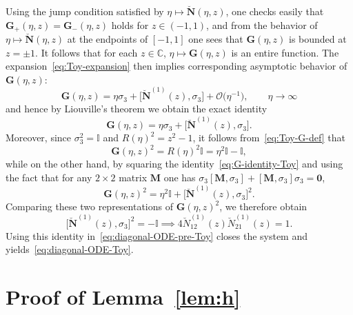 \documentclass[pdftex]{sigma}
\numberwithin{equation}{section}
\begin{document}
Using the jump condition satisfied by $\eta\mapsto\breve{\mathbf{N}}(\eta,z)$, one checks easily that $\mathbf{G}_+(\eta,z)=\mathbf{G}_-(\eta,z)$ holds for $z\in (-1,1)$, and from the behavior of $\eta\mapsto\breve{\mathbf{N}}(\eta,z)$ at the endpoints of $[-1,1]$ one sees that $\mathbf{G}(\eta,z)$ is bounded at $z=\pm 1$. It follows that for each $z\in\mathbb{C}$, $\eta\mapsto \mathbf{G}(\eta,z)$ is an entire function. The expansion~\eqref{eq:Toy-expansion} then implies corresponding asymptotic behavior of $\mathbf{G}(\eta,z)$:
\[
\mathbf{G}(\eta,z)=\eta\sigma_3 + \big[\breve{\mathbf{N}}^{(1)}(z),\sigma_3\big] + \mathcal{O}\bigl(\eta^{-1}\bigr),\qquad\eta\to\infty
\]
and hence by Liouville's theorem we obtain the exact identity
\begin{equation}
\mathbf{G}(\eta,z)=\eta\sigma_3 + \big[\breve{\mathbf{N}}^{(1)}(z),\sigma_3\big].
\label{eq:G-identity-Toy}
\end{equation}
Moreover, since $\sigma_3^2=\mathbb{I}$ and $R(\eta)^2=z^2-1$, it follows from~\eqref{eq:Toy-G-def} that
\[
\mathbf{G}(\eta,z)^2=R(\eta)^2\mathbb{I} = \eta^2\mathbb{I}-\mathbb{I},
\]
while on the other hand, by squaring the identity~\eqref{eq:G-identity-Toy} and using the fact that for any $2\times 2$ matrix $\mathbf{M}$ one has $\sigma_3[\mathbf{M},\sigma_3]+[\mathbf{M},\sigma_3]\sigma_3=\mathbf{0}$,
\[
\mathbf{G}(\eta,z)^2 = \eta^2\mathbb{I} + \big[\breve{\mathbf{N}}^{(1)}(z),\sigma_3\big]^2.
\]
Comparing these two representations of $\mathbf{G}(\eta,z)^2$, we therefore obtain
\[
\big[\breve{\mathbf{N}}^{(1)}(z),\sigma_3\big]^2=-\mathbb{I}\implies 4\breve{N}^{(1)}_{12}(z)\breve{N}^{(1)}_{21}(z)=1.
\]
Using this identity in~\eqref{eq:diagonal-ODE-pre-Toy} closes the system and yields~\eqref{eq:diagonal-ODE-Toy}.

\section{Proof of Lemma~\ref{lem:h}}
\end{document}
